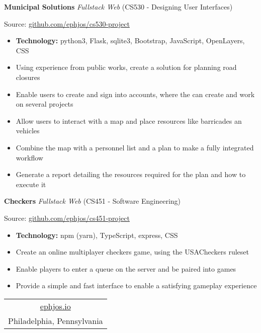 \documentclass[10pt]{article}
\begin{document}
\vspace{-0.75em}
\textbf{Municipal Solutions}
\emph{Fullstack Web}
(CS530 - Designing User Interfaces)

\indent \indent Source: \href{https://github.com/ephjos/cs530-project}{github.com/ephjos/cs530-project}

\vspace{-\topsep}
\begin{itemize}
\setlength\itemsep{-0.5em}
\item \textbf{Technology:} python3, Flask, sqlite3, Bootstrap, JavaScript, OpenLayers, CSS
\item Using experience from public works, create a solution for planning road closures
\item Enable users to create and sign into accounts, where the can create and work on several projects
\item Allow users to interact with a map and place resources like barricades an vehicles
\item Combine the map with a personnel list and a plan to make a fully integrated workflow
\item Generate a report detailing the resources required for the plan and how to execute it
\end{itemize}

\vspace{-0.75em}
\textbf{Checkers}
\emph{Fullstack Web}
(CS451 - Software Engineering)

\indent \indent Source: \href{https://github.com/ephjos/cs451-project}{github.com/ephjos/cs451-project}

\vspace{-\topsep}
\begin{itemize}
\setlength\itemsep{-0.5em}
\item \textbf{Technology:} npm (yarn), TypeScript, express, CSS
\item Create an online multiplayer checkers game, using the USACheckers ruleset
\item Enable players to enter a queue on the server and be paired into games
\item Provide a simple and fast interface to enable a satisfying gameplay experience
\end{itemize}

\hrulefill

\begin{center}
\begin{tabular}{c}
  \href{http://ephjos.io}{ephjos.io} \\
	Philadelphia, Pennsylvania \\
\end{tabular}
\end{center}
\end{document}
